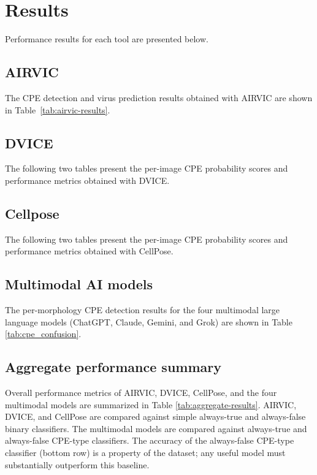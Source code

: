 \section*{Results}
\label{sec:results}
Performance results for each tool are presented below.
\clearpage
\subsection*{AIRVIC}
The CPE detection and virus prediction results obtained with AIRVIC are shown in Table~\ref{tab:airvic-results}.

\clearpage

\subsection*{DVICE}
The following two tables present the per-image CPE probability scores and performance metrics obtained with DVICE.


\clearpage

\subsection*{Cellpose}
The following two tables present the per-image CPE probability scores and performance metrics obtained with CellPose.



\clearpage

\subsection*{Multimodal AI models}
The per-morphology CPE detection results for the four multimodal large language models (ChatGPT, Claude, Gemini, and Grok) are shown in Table \ref{tab:cpe_confusion}.



\subsection*{Aggregate performance summary}
Overall performance metrics of AIRVIC, DVICE, CellPose, and the four multimodal models are summarized in Table \ref{tab:aggregate-results}. AIRVIC, DVICE, and CellPose are compared against simple always-true and always-false binary classifiers. The multimodal models are compared against always-true and always-false CPE-type classifiers. The accuracy of the always-false CPE-type classifier (bottom row) is a property of the dataset; any useful model must substantially outperform this baseline.


